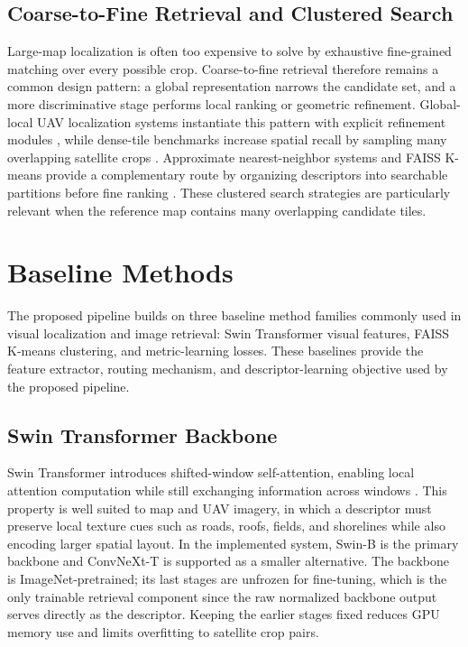 \documentclass[conference]{IEEEtran}
\begin{document}
\subsection{Coarse-to-Fine Retrieval and Clustered Search}
Large-map localization is often too expensive to solve by exhaustive
fine-grained matching over every possible crop. Coarse-to-fine retrieval
therefore remains a common design pattern: a global representation narrows the
candidate set, and a more discriminative stage performs local ranking or
geometric refinement. Global-local UAV localization systems instantiate this
pattern with explicit refinement modules \cite{li2023glvl}, while dense-tile
benchmarks increase spatial recall by sampling many overlapping satellite
crops \cite{dai2024denseuav}. Approximate nearest-neighbor systems and FAISS
K-means provide a complementary route by organizing descriptors into searchable
partitions before fine ranking \cite{johnson2019billion}. These clustered
search strategies are particularly relevant when the reference map contains
many overlapping candidate tiles.

\section{Baseline Methods}
The proposed pipeline builds on three baseline method families commonly used
in visual
localization and image retrieval: Swin Transformer visual features,
FAISS K-means clustering, and
metric-learning losses. These baselines provide the feature extractor,
routing mechanism, and descriptor-learning objective used by the
proposed pipeline.

\subsection{Swin Transformer Backbone}
Swin Transformer introduces shifted-window self-attention, enabling local
attention computation while still exchanging information across windows
\cite{liu2021swin}. This property is well suited to map and UAV imagery, in which a
descriptor must preserve local texture cues such as roads, roofs, fields, and
shorelines while also encoding larger spatial layout. In the implemented
system, Swin-B is the primary backbone and ConvNeXt-T is supported as a
smaller alternative. The backbone is ImageNet-pretrained; its last stages
are unfrozen for fine-tuning, which is the only trainable retrieval
component since the raw normalized backbone output serves directly as the
descriptor. Keeping the earlier stages fixed reduces GPU memory use and
limits overfitting to satellite crop pairs.
\end{document}
